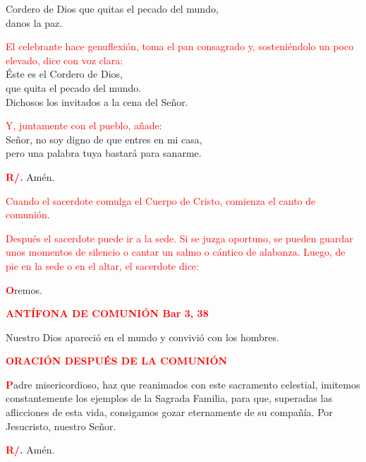 \documentclass[12pt, letterpaper, spanish]{article}
\begin{document}
  \noindent
  \Large Cordero de Dios que quitas el pecado del mundo,\\ 
  danos la paz.
  
  \clearpage

  \large{\textcolor{red}{El celebrante hace genuflexi\'on, toma el pan consagrado y, sosteni\'endolo un poco elevado, dice con voz clara:}}\\
  \Large \'Este es el Cordero de Dios,\\ 
  que quita el pecado del mundo.\\ 
  Dichosos los invitados a la cena del Se\~nor.

  \large{\textcolor{red}{Y, juntamente con el pueblo, a\~nade:}}\\
  \Large Se\~nor, no soy digno de que entres en mi casa,\\ 
  pero una palabra tuya bastar\'a para sanarme.

  \noindent
  \Large {\bfseries \textcolor{red}{R/.}} \hspace{0.5cm} Am\'en.

  \large{\textcolor{red}{Cuando el sacerdote comulga el Cuerpo de Cristo, comienza el canto de comuni\'on.}}

  \large{\textcolor{red}{Despu\'es el sacerdote puede ir a la sede. Si se juzga oportuno, se pueden guardar unos momentos de silencio o cantar un salmo o c\'antico de alabanza. Luego, de pie en la sede o en el altar, el sacerdote dice:}}

  \noindent
  \lettrine[lines=1]{\bfseries \textcolor{red}{O}}{}\Large remos.

  \large {\bfseries \textcolor{red}{ANT\'IFONA DE COMUNI\'ON \hspace{1cm} Bar 3, 38}}

  \noindent
  \Large Nuestro Dios apareci\'o en el mundo y convivi\'o con los hombres.

  \large {\bfseries \textcolor{red}{ORACI\'ON DESPU\'ES DE LA COMUNI\'ON}}

  \lettrine[lines=2]{\bfseries \textcolor{red}{P}}{}\Large adre misericordioso, haz que reanimados con este sacramento celestial, imitemos constantemente los ejemplos de la Sagrada Familia, para que, superadas las aflicciones de esta vida, consigamos gozar eternamente de su compa\~n\'ia. Por Jesucristo, nuestro Se\~nor.

  \noindent
  \Large {\bfseries \textcolor{red}{R/.}} \hspace{0.5cm} Am\'en.


  \clearpage
\end{document}
